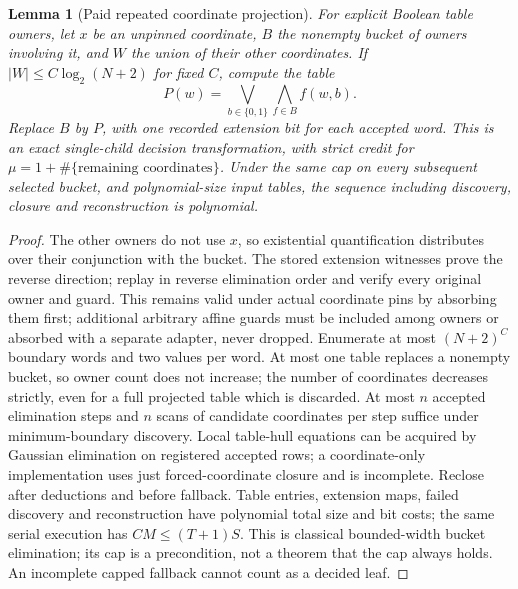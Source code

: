 \documentclass[11pt]{article}
\newtheorem{lemma}[theorem]{Lemma}
\begin{document}
\begin{lemma}[Paid repeated coordinate projection]\label{lem:bs17-bucket}
For explicit Boolean table owners, let $x$ be an unpinned coordinate, $B$ the nonempty bucket of owners involving it, and $W$ the union of their other coordinates. If $|W|\le C\log_2(N+2)$ for fixed $C$, compute the table
\[
P(w)=\bigvee_{b\in\{0,1\}}\bigwedge_{f\in B}f(w,b).
\]
Replace $B$ by $P$, with one recorded extension bit for each accepted word. This is an exact single-child decision transformation, with strict credit for $\mu=1+\#\{\text{remaining coordinates}\}$. Under the same cap on every subsequent selected bucket, and polynomial-size input tables, the sequence including discovery, closure and reconstruction is polynomial.
\end{lemma}
\begin{proof}
The other owners do not use $x$, so existential quantification distributes over their conjunction with the bucket. The stored extension witnesses prove the reverse direction; replay in reverse elimination order and verify every original owner and guard. This remains valid under actual coordinate pins by absorbing them first; additional arbitrary affine guards must be included among owners or absorbed with a separate adapter, never dropped. Enumerate at most $(N+2)^C$ boundary words and two values per word. At most one table replaces a nonempty bucket, so owner count does not increase; the number of coordinates decreases strictly, even for a full projected table which is discarded. At most $n$ accepted elimination steps and $n$ scans of candidate coordinates per step suffice under minimum-boundary discovery. Local table-hull equations can be acquired by Gaussian elimination on registered accepted rows; a coordinate-only implementation uses just forced-coordinate closure and is incomplete. Reclose after deductions and before fallback. Table entries, extension maps, failed discovery and reconstruction have polynomial total size and bit costs; the same serial execution has $CM\le(T+1)S$. This is classical bounded-width bucket elimination; its cap is a precondition, not a theorem that the cap always holds. An incomplete capped fallback cannot count as a decided leaf.
\end{proof}
\end{document}
